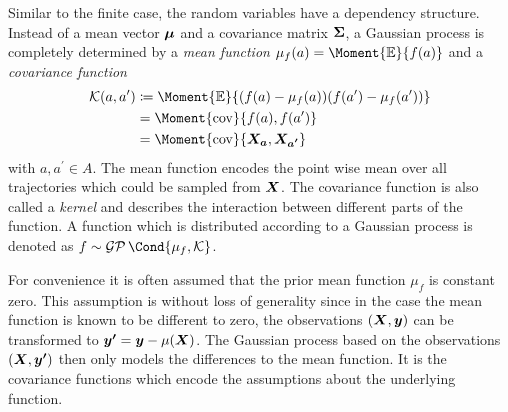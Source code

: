 Similar to the finite case, the random variables have a dependency structure.
Instead of a mean vector $\bm{\mu}$ and a covariance matrix $\bm{\Sigma}$, a Gaussian process is completely determined by a \emph{mean function} $\mu_f(a) = \Moment{\E}{f(a)}$ and a \emph{covariance function}
\begin{align}
    \begin{split}
        \K(a, a^\prime) &\coloneqq \Moment{\E}{(f(a) - \mu_f(a))(f(a^\prime) - \mu_f(a^\prime))} \\
        &= \Moment{\cov}{f(a), f(a^\prime)} \\
        &= \Moment{\cov}{\rv{X_a}, \rv{X_{a^\prime}}}
    \end{split}
\end{align}
with $a, a^\prime \in A$.
The mean function encodes the point wise mean over all trajectories which could be sampled from $\bm{X}$.
The covariance function is also called a \emph{kernel} and describes the interaction between different parts of the function.
A function which is distributed according to a Gaussian process is denoted as $f \sim \GP\Cond{\mu_f, \K}$.

For convenience it is often assumed that the prior mean function $\mu_f$ is constant zero.
This assumption is without loss of generality \cite{rasmussen_gaussian_2006} since in the case the mean function is known to be different to zero, the observations $\left( \bm{X}, \bm{y} \right)$ can be transformed to $\bm{y^\prime} = \bm{y} - \mu(\bm{X})$.
The Gaussian process based on the observations $\left( \bm{X}, \bm{y^\prime} \right)$ then only models the differences to the mean function.
It is the covariance functions which encode the assumptions about the underlying function.

